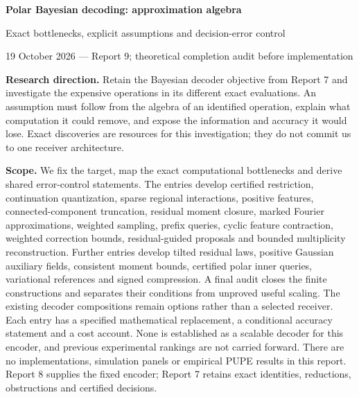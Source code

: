 \documentclass[10pt,a4paper]{article}
\begin{document}
{\LARGE\bfseries Polar Bayesian decoding: approximation algebra}\par
{\large Exact bottlenecks, explicit assumptions and decision-error control}\par
{\color{muted}19 October 2026 --- Report 9; theoretical completion audit before implementation}

\textbf{Research direction.} Retain the Bayesian decoder objective from Report 7 and investigate the expensive
operations in its different exact evaluations. An assumption must follow from the algebra of an identified
operation, explain what computation it could remove, and expose the information and accuracy it would lose.
Exact discoveries are resources for this investigation; they do not commit us to one receiver architecture.

\textbf{Scope.} We fix the target, map the exact computational bottlenecks and derive shared error-control
statements. The entries develop certified restriction, continuation quantization, sparse regional interactions,
positive features, connected-component truncation, residual moment closure, marked Fourier approximations,
weighted sampling, prefix queries, cyclic feature contraction, weighted correction bounds, residual-guided
proposals and bounded multiplicity reconstruction. Further entries develop tilted residual laws, positive Gaussian
auxiliary fields, consistent moment bounds, certified polar inner queries, variational references and signed
compression. A final audit closes the finite constructions and separates their conditions from unproved
useful scaling. The existing decoder compositions remain options rather than a selected receiver. Each entry has
a specified mathematical replacement, a conditional accuracy statement and a cost account.
None is established as a scalable decoder for this encoder, and previous experimental rankings are not carried forward. There are
no implementations, simulation panels or empirical PUPE results in this report. Report 8 supplies the fixed
encoder; Report 7 retains exact identities, reductions, obstructions and certified decisions.
\end{document}
